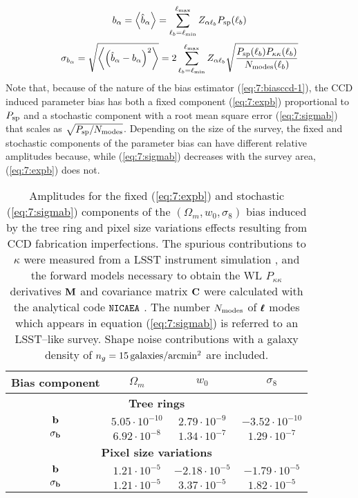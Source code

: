 \begin{equation}
\label{eq:7:expb}
b_\alpha = \left\langle\hat{b}_\alpha\right\rangle = \sum_{\ell_b=\ell_{\rm min}}^{\ell_{\rm max}} Z_{\alpha\ell_b}P_{\rm sp}(\ell_b)
\end{equation}
%
\begin{equation}
\label{eq:7:sigmab}
\sigma_{b_\alpha} = \sqrt{\left\langle\left(\hat{b}_\alpha-b_\alpha\right)^2\right\rangle} = 2\sum_{\ell_b=\ell_{\rm min}}^{\ell_{\rm max}} Z_{\alpha\ell_b}\sqrt{\frac{P_{\rm sp}(\ell_b)P_{\kappa\kappa}(\ell_b)}{N_{\rm modes}(\ell_b)}}
\end{equation}
%
Note that, because of the nature of the bias estimator (\ref{eq:7:biasccd-1}), the CCD induced parameter bias has both a fixed component (\ref{eq:7:expb}) proportional to $P_{\rm sp}$ and a stochastic component with a root mean square error (\ref{eq:7:sigmab}) that scales as $\sqrt{P_{\rm sp}/N_{\rm modes}}$. Depending on the size of the survey, the fixed and stochastic components of the parameter bias can have different relative amplitudes because, while (\ref{eq:7:sigmab}) decreases with the survey area, (\ref{eq:7:expb}) does not.
%
\begin{table}
\begin{center}
\begin{tabular}{c|ccc}
\textbf{Bias component} & $\Omega_m$ & $w_0$ & $\sigma_8$ \\ \hline \hline
\multicolumn{4}{c}{\textbf{Tree rings}} \\ \hline
$\mathbf{b}$ & $5.05\cdot 10^{-10}$ & $2.79\cdot 10^{-9}$ & $-3.52\cdot 10^{-10}$ \\
$\sigma_{\mathbf{b}}$ & $6.92\cdot 10^{-8}$ & $1.34\cdot 10^{-7}$ & $1.29\cdot 10^{-7}$ \\ \hline

\multicolumn{4}{c}{\textbf{Pixel size variations}} \\ \hline
$\mathbf{b}$ & $1.21\cdot 10^{-5}$ & $-2.18\cdot 10^{-5}$ & $-1.79\cdot 10^{-5}$ \\
$\sigma_{\mathbf{b}}$ & $1.21\cdot 10^{-5}$ & $3.37\cdot 10^{-5}$ & $1.82\cdot 10^{-5}$ \\ \hline
\end{tabular}
\end{center}
\caption{Amplitudes for the fixed (\ref{eq:7:expb}) and stochastic (\ref{eq:7:sigmab}) components of the $(\Omega_m,w_0,\sigma_8)$ bias induced by the tree ring and pixel size variations effects resulting from CCD fabrication imperfections. The spurious contributions to $\kappa$ were measured from a LSST instrument simulation \citep{PetriCCD}, and the forward models necessary to obtain the WL $P_{\kappa\kappa}$ derivatives $\mathbf{M}$ and covariance matrix $\mathbf{C}$ were calculated with the analytical code $\texttt{NICAEA}$ \citep{Nicaea}. The number $N_{\rm modes}$ of $\pmb{\ell}$ modes which appears in equation (\ref{eq:7:sigmab}) is referred to an LSST--like survey. Shape noise contributions with a galaxy density of $n_g=15\,{\rm galaxies/arcmin^2}$ are included.}
\label{tab:7:ccdbias}
\end{table}
